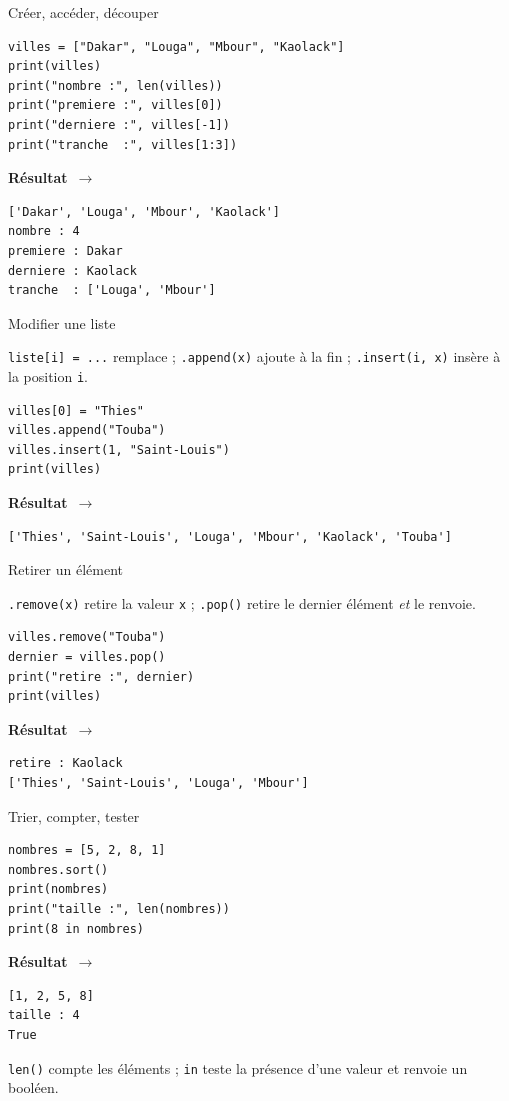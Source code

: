 \documentclass[aspectratio=169,11pt]{beamer}
\newcommand{\resultat}{{\scriptsize\textbf{R\'esultat}~$\rightarrow$}\par\vspace{1pt}}
\begin{document}
\begin{frame}[fragile]{Créer, accéder, découper}
\begin{lstlisting}
villes = ["Dakar", "Louga", "Mbour", "Kaolack"]
print(villes)
print("nombre :", len(villes))
print("premiere :", villes[0])
print("derniere :", villes[-1])
print("tranche  :", villes[1:3])
\end{lstlisting}
\resultat
\begin{lstlisting}[style=out]
['Dakar', 'Louga', 'Mbour', 'Kaolack']
nombre : 4
premiere : Dakar
derniere : Kaolack
tranche  : ['Louga', 'Mbour']
\end{lstlisting}
\end{frame}

\begin{frame}[fragile]{Modifier une liste}
\begin{ucadex}
{\small \texttt{liste[i] = ...} remplace ; \texttt{.append(x)} ajoute à la fin ; \texttt{.insert(i, x)} insère à la position \texttt{i}.}
\end{ucadex}
\begin{lstlisting}
villes[0] = "Thies"
villes.append("Touba")
villes.insert(1, "Saint-Louis")
print(villes)
\end{lstlisting}
\resultat
\begin{lstlisting}[style=out]
['Thies', 'Saint-Louis', 'Louga', 'Mbour', 'Kaolack', 'Touba']
\end{lstlisting}
\end{frame}

\begin{frame}[fragile]{Retirer un élément}
\begin{ucadex}
{\small \texttt{.remove(x)} retire la valeur \texttt{x} ; \texttt{.pop()} retire le dernier élément \emph{et} le renvoie.}
\end{ucadex}
\begin{lstlisting}
villes.remove("Touba")
dernier = villes.pop()
print("retire :", dernier)
print(villes)
\end{lstlisting}
\resultat
\begin{lstlisting}[style=out]
retire : Kaolack
['Thies', 'Saint-Louis', 'Louga', 'Mbour']
\end{lstlisting}
\end{frame}

\begin{frame}[fragile]{Trier, compter, tester}
\begin{lstlisting}
nombres = [5, 2, 8, 1]
nombres.sort()
print(nombres)
print("taille :", len(nombres))
print(8 in nombres)
\end{lstlisting}
\resultat
\begin{lstlisting}[style=out]
[1, 2, 5, 8]
taille : 4
True
\end{lstlisting}
{\small \texttt{len()} compte les éléments ; \texttt{in} teste la présence d'une valeur et renvoie un booléen.}
\end{frame}
\end{document}
